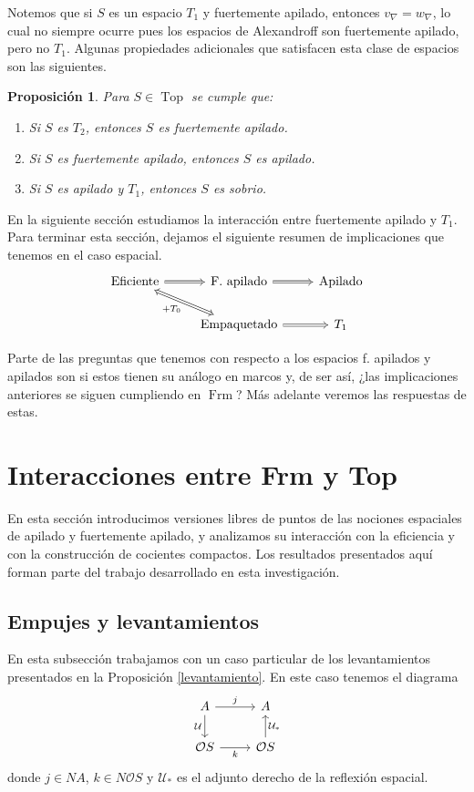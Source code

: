 \documentclass[12pt]{article}
\newtheorem{prop}[thm]{Proposición}
\DeclareMathOperator{\Frm}{Frm}
\DeclareMathOperator{\Top}{Top}
\begin{document}
Notemos que si $S$ es un espacio $T_1$ y fuertemente apilado, entonces $v_\nabla=w_\nabla$, lo cual no siempre ocurre pues los espacios de Alexandroff son fuertemente apilado, pero 
no $T_1$. Algunas propiedades adicionales que satisfacen esta clase de espacios son las siguientes.

\begin{prop}\label{Propiedadesapilado}
Para $S\in \Top$ se cumple que:
\begin{enumerate}
\item Si $S$ es $T_2$, entonces $S$ es fuertemente apilado.
\item Si $S$ es fuertemente apilado, entonces $S$ es apilado.
\item Si $S$ es apilado y $T_1$, entonces $S$ es sobrio.
\end{enumerate}
\end{prop}

En la siguiente sección estudiamos la interacción entre fuertemente apilado y $T_1$. Para terminar 
esta sección, dejamos el siguiente resumen de implicaciones que tenemos en el caso espacial.
\[\begin{tikzcd}
  {\text{Eficiente}} & {\text{F. apilado}} & {\text{Apilado}} \\
  & {\text{Empaquetado}} & {T_1}
  \arrow[Rightarrow, from=1-1, to=1-2]
  \arrow["{+ T_0}"', Leftrightarrow, from=1-1, to=2-2]
  \arrow[Rightarrow, from=1-2, to=1-3]
  \arrow[Rightarrow, from=2-2, to=2-3]
\end{tikzcd}\]

Parte de las preguntas que tenemos con respecto a los espacios f. apilados y apilados son si estos tienen su análogo en marcos y, de ser así, 
¿las implicaciones anteriores se siguen cumpliendo en $\Frm$? Más adelante veremos las respuestas de estas.

\section{Interacciones entre Frm y Top}\label{Interacciones}
En esta sección introducimos versiones libres de puntos de las nociones espaciales de apilado y fuertemente apilado, y analizamos su interacción 
con la eficiencia y con la construcción de cocientes compactos. Los resultados presentados aquí forman parte del trabajo desarrollado en esta investigación.

\subsection{Empujes y levantamientos}
En esta subsección trabajamos con un caso particular de los levantamientos presentados en la Proposición \ref{levantamiento}. En este caso tenemos el diagrama
\[\begin{tikzcd}
	A & A \\
	{\mathcal{O}S} & {\mathcal{O}S}
	\arrow["j", from=1-1, to=1-2]
	\arrow["{\mathcal{U}}"', from=1-1, to=2-1]
	\arrow["k"', from=2-1, to=2-2]
	\arrow["{{\mathcal{U}}_*}"', from=2-2, to=1-2]
\end{tikzcd}\]
donde $j\in NA$, $k\in N\mathcal{O}S$ y $\mathcal{U}_*$ es el adjunto derecho de la reflexión espacial.\\
\end{document}
